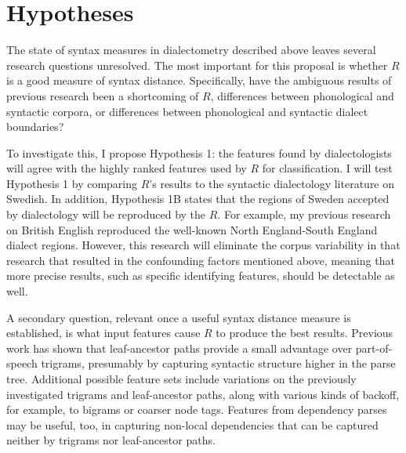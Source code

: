 



\section{Hypotheses}
The state of syntax measures in dialectometry described above leaves
several research questions unresolved. The most important for this
proposal is whether $R$ is a good measure of syntax
distance. Specifically, have the ambiguous results of previous
research been a shortcoming of $R$, differences between phonological
and syntactic corpora, or differences between phonological and
syntactic dialect boundaries?

To investigate this, I propose Hypothesis 1: the features found by
dialectologists will agree with the highly ranked features used by $R$
for classification. I will test Hypothesis 1 by comparing $R$'s
results to the syntactic dialectology literature on Swedish. In
addition, Hypothesis 1B states that the regions of Sweden accepted by
dialectology will be reproduced by the $R$. For example, my
previous research on British English reproduced the well-known North
England-South England dialect regions. However, this research will eliminate the
corpus variability in that research \cite{sanders08b} that resulted in
the confounding factors mentioned above, meaning that more precise
results, such as specific identifying features, should be detectable as well.

A secondary question, relevant once a useful syntax distance measure
is established, is what input features cause $R$ to produce the best
results.  Previous work has shown that leaf-ancestor paths provide a
small advantage over part-of-speech trigrams, presumably by capturing
syntactic structure higher in the parse tree. Additional possible
feature sets include variations on the previously investigated
trigrams and leaf-ancestor paths, along with various kinds of backoff,
for example, to bigrams or coarser node tags. Features from dependency
parses may be useful, too, in capturing non-local dependencies that
can be captured neither by trigrams nor leaf-ancestor paths.

